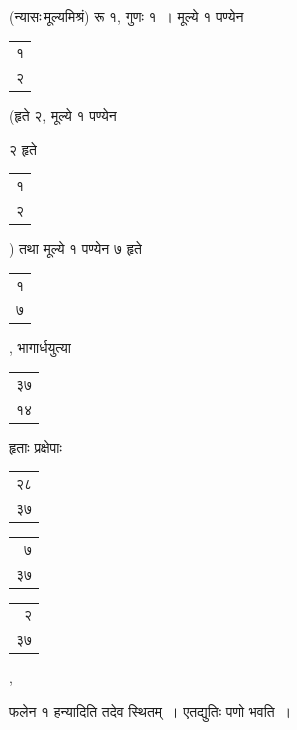 \documentclass[10pt, openany]{book}
\begin{document}
{{{(न्यासः\textendash \,मूल्यमिश्रं) रू १, गुणः १~। मूल्ये १ पण्येन\begin{tabular}{r}१\\ २\end{tabular}\bigg(हृते २,
मूल्ये १ पण्येन}
{२ हृते\begin{tabular}{r}१\\ २\end{tabular}\bigg) तथा मूल्ये १ पण्येन ७ हृते\begin{tabular}{r}१\\ ७\end{tabular}, भागार्धयुत्या\begin{tabular}{r}३७\\ १४\end{tabular}हृताः
प्रक्षेपाः\begin{tabular}{r|}२८\\ ३७\end{tabular}\begin{tabular}{r|}७ \\३७ \end{tabular}\begin{tabular}{r}२\\ ३७\end{tabular},}
{फलेन १ हन्यादिति तदेव स्थितम्~। एतद्युतिः पणो भवति~।} 
\vspace{3mm}

}}
\end{document}
